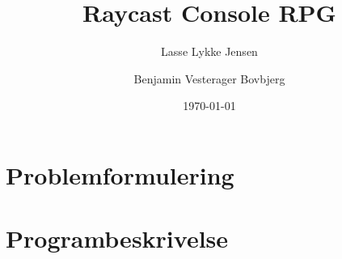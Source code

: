 \documentclass[11pt]{article}
\author{Lasse Lykke Jensen \and Benjamin Vesterager Bovbjerg}
\date{\today}
\title{Raycast Console RPG}
\begin{document}
\maketitle
\tableofcontents

\section*{Problemformulering}

\section*{Programbeskrivelse}
\end{document}
